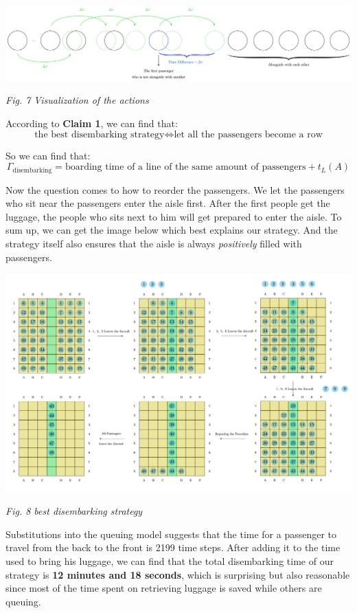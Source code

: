 \documentclass{article}
\theoremstyle{definition}
\theoremstyle{remark}
\numberwithin{equation}{section}
\begin{document}
	\begin{center}
		\includegraphics[width = 14cm]{display of Delta tau.jpg}

		\small\textit{Fig. 7 Visualization of the actions}
	\end{center}

	According to \textbf{Claim 1}, we can find that:
	$$\text{the best disembarking strategy}\Leftrightarrow
	\text{let all the passengers become a row}$$

	So we can find that:
	$$\Gamma_\text{disembarking}=\text{boarding time of a line of the same amount of passengers}+t_L(A)$$

	Now the question comes to how to reorder the passengers. We let the passengers who sit near the passengers enter the aisle first. After the first people get the luggage, the people who sits next to him will get prepared to enter the aisle. To sum up, we can get the image below which best explains our strategy. And the strategy itself also ensures that the aisle is always \textit{positively} filled with passengers.

	\begin{center}
		\includegraphics[width=15cm]{disembarking.jpg}

		\small \textit{Fig. 8 best disembarking strategy}
	\end{center}

	Substitutions into the queuing model suggests that the time for a passenger to travel from the back to the front is 2199 time steps. After adding it to the time used to bring his luggage, we can find that the total disembarking time of our strategy is \textbf{12 minutes and 18 seconds}, which is surprising but also reasonable since most of the time spent on retrieving luggage is saved while others are queuing.
\end{document}
